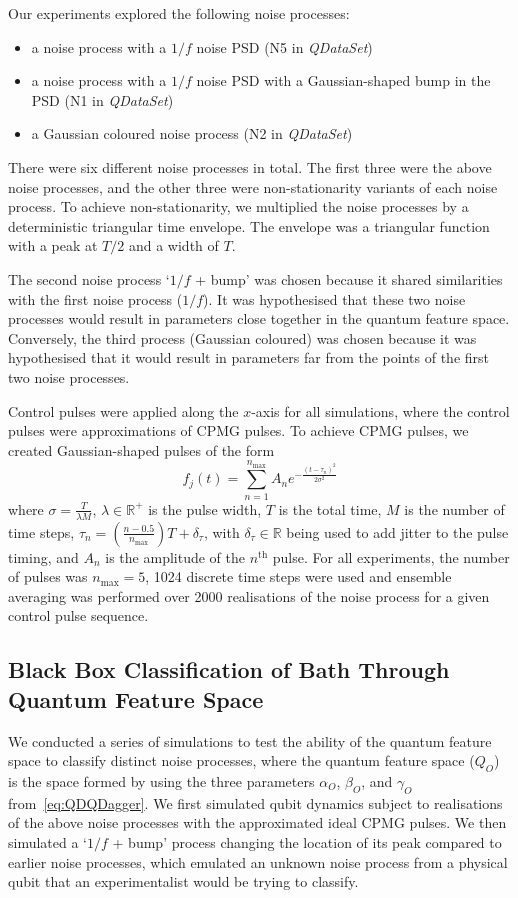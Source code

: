 \documentclass[12pt]{iopart}
\begin{document}
Our experiments explored the following noise processes:
\begin{itemize}
    \item a noise process with a $1/f$ noise PSD (N5 in \textit{QDataSet})
    \item a noise process with a $1/f$ noise PSD with a Gaussian-shaped bump in the PSD (N1 in \textit{QDataSet})
    \item a Gaussian coloured noise process (N2 in \textit{QDataSet})
\end{itemize}
There were six different noise processes in total. The first three were the above noise processes, and the other three were non-stationarity variants of each noise process. To achieve non-stationarity, we multiplied the noise processes by a deterministic triangular time envelope. The envelope was a triangular function with a peak at $T/2$ and a width of $T$.

The second noise process `$1/f$ + bump' was chosen because it shared similarities with the first noise process ($1/f$). It was hypothesised that these two noise processes would result in parameters close together in the quantum feature space. Conversely, the third process (Gaussian coloured) was chosen because it was hypothesised that it would result in parameters far from the points of the first two noise processes.

Control pulses were applied along the $x$-axis for all simulations, where the control pulses were approximations of CPMG pulses. To achieve CPMG pulses, we created Gaussian-shaped pulses of the form
\begin{equation} \label{eq:gaussian_pulse}
 f_{j}(t)=\sum_{n=1}^{n_{\max }} A_n e^{-\frac{\left(t-\tau_{n}\right)^{2}}{2 \sigma^{2}}}
\end{equation}
where $\sigma=\frac{T}{\lambda M}$, $\lambda \in \mathbb{R}^+$ is the pulse width, $T$ is the total time, $M$ is the number of time steps, $\tau_{n}=\left(\frac{n-0.5}{n_{\max }}\right) T+\delta_{\tau}$, with $\delta_{\tau} \in \mathbb{R}$ being used to add jitter to the pulse timing, and $A_n$ is the amplitude of the $n^{\mathrm{th}}$ pulse. For all experiments, the number of pulses was $n_{\max}=5$, 1024 discrete time steps were used and ensemble averaging was performed over 2000 realisations of the noise process for a given control pulse sequence.

\subsection{Black Box Classification of Bath Through Quantum Feature Space \label{subsec:black_box_noise_spectroscopy}}
We conducted a series of simulations to test the ability of the quantum feature space to classify distinct noise processes, where the quantum feature space ($Q_O$) is the space formed by using the three parameters $\alpha_O$, $\beta_O$, and $\gamma_O$ from~\cref{eq:QDQDagger}. We first simulated qubit dynamics subject to realisations of the above noise processes with the approximated ideal CPMG pulses. We then simulated a `$1/f$ + bump' process changing the location of its peak compared to earlier noise processes, which emulated an unknown noise process from a physical qubit that an experimentalist would be trying to classify.
\end{document}
